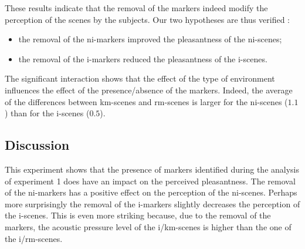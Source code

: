 \documentclass[12pt]{elsarticle}
\begin{document}
These results indicate that the removal of the markers indeed modify the perception of the scenes by the subjects. Our two hypotheses are thus verified :


\begin{itemize}
\item the removal of the ni-markers improved the pleasantness of the ni-scenes;
\item the removal of the i-markers reduced the pleasantness of the i-scenes.
\end{itemize}


The significant interaction shows that the effect of the type of environment influences the effect of the presence/absence of the markers. Indeed, the average of the differences between km-scenes and rm-scenes is larger for the ni-scenes ($1.1$) than for the i-scenes ($0.5$).

\subsection{Discussion}


This experiment shows that the presence of markers identified during the analysis of experiment 1 does have an impact on the perceived pleasantness. The removal of the ni-markers has a positive effect on the perception of the ni-scenes. Perhaps more surprisingly the removal of the i-markers slightly decreases the perception of the i-scenes. This is even more striking because, due to the removal of the markers, the acoustic pressure level of the i/km-scenes is higher than the one of the i/rm-scenes.
\end{document}
